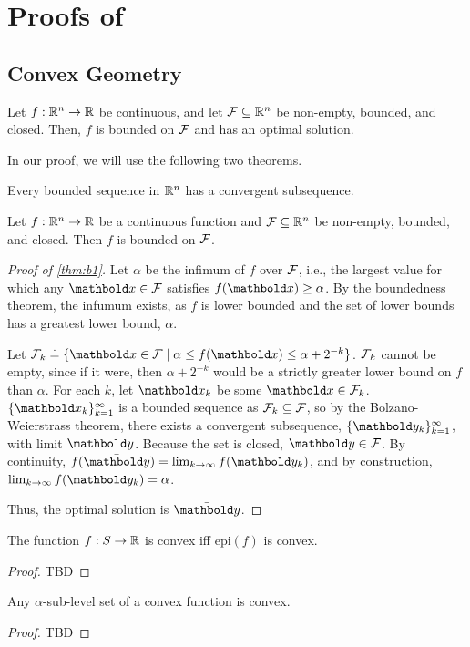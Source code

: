 
\chapter{Proofs of }

\section{Convex Geometry}

\begin{thm}\label{thm:b1}
Let $f : \mathbb{R}^n \to \mathbb{R}$ be continuous, and let $\mathcal{F} \subseteq \mathbb{R}^n$ be non-empty, bounded, and closed. Then, $f$ is bounded on $\mathcal{F}$ and has an optimal solution.
\end{thm} In our proof, we will use the following two theorems.
\begin{thm} Every bounded sequence in $\mathbb{R}^n$ has a convergent subsequence.
\end{thm}
\begin{thm}
Let $f : \mathbb{R}^n \to \mathbb{R}$ be a continuous function and $\mathcal{F} \subseteq \mathbb{R}^n$ be non-empty, bounded, and closed. Then $f$ is bounded on $\mathcal{F}$.
\end{thm}
\begin{proof}[Proof of \cref{thm:b1}] Let $\alpha$ be the infimum of $f$ over $\mathcal{F}$, i.e., the largest value for which any $\vx \in \spa{F}$ satisfies $f(\vx) \geq \alpha$. By the boundedness theorem, the infumum exists, as $f$ is lower bounded and the set of lower bounds has a greatest lower bound, $\alpha$.

Let $\spa{F}_k \defeq \{\vx \in \spa{F} \mid \alpha \leq f(\vx) \leq \alpha + 2^{-k}\}$. $\mathcal{F}_k$ cannot be empty, since if it were, then $\alpha + 2^{-k}$ would be a strictly greater lower bound on $f$ than $\alpha$. For each $k$, let $\vx_k$ be some $\vx \in \spa{F}_k$. $\{\vx_k\}_{k=1}^\infty$ is a bounded sequence as $\mathcal{F}_k \subseteq \mathcal{F}$, so by the Bolzano-Weierstrass theorem, there exists a convergent subsequence, $\{\vy_k\}_{k=1}^\infty$, with limit $\Bar{\vy}$. Because the set is closed, $\Bar{\vy} \in \spa{F}$. By continuity, $f(\Bar{\vy}) = \lim_{k\to\infty} f(\vy_k)$, and by construction, $\lim_{k\to\infty} f(\vy_k) = \alpha$.

Thus, the optimal solution is $\Bar{\vy}$.
\end{proof}

\begin{lem}\label{lem:b1}
The function $f : S \to \mathbb{R}$ is convex iff $\mathrm{epi}(f)$ is convex.
\end{lem}
\begin{proof} TBD
\end{proof}

\begin{lem}\label{lem:b2}
Any $\alpha$-sub-level set of a convex function is convex.
\end{lem}
\begin{proof} TBD
\end{proof}